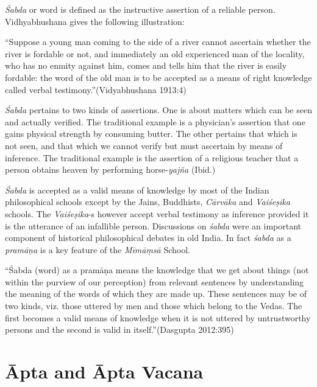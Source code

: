 \textit{Śabda} or word is defined as the instructive assertion of a reliable person. Vidhyabhushana gives the following illustration:

\newpage

\begin{myquote}
“Suppose a young man coming to the side of a river cannot ascertain whether the river is fordable or not, and immediately an old experienced man of the locality, who has no enmity against him, comes and tells him that the river is easily fordable: the word of the old man is to be accepted as a means of right knowledge called verbal testimony.”(Vidyabhushana 1913:4)
\end{myquote}

\textit{Śabda} pertains to two kinds of assertions. One is about matters which can be seen and actually verified. The traditional example is a physician’s assertion that one gains physical strength by consuming butter. The other pertains that which is not seen, and that which we cannot verify but must ascertain by means of inference. The traditional example is the assertion of a religious teacher that a person obtains heaven by performing horse-\textit{yajña} (Ibid.)

\textit{Śabda} is accepted as a valid means of knowledge by most of the Indian philosophical schools except by the Jains, Buddhists, \textit{Cārvāka} and \textit{Vaiśeṣika} schools. The \textit{Vaiśeṣika}-s however accept verbal testimony as inference provided it is the utterance of an infallible person. Discussions on \textit{śabda} were an important component of historical philosophical debates in old India. In fact \textit{śabda} as a \textit{pramāṇa} is a key feature of the \textit{Mīmāṃsā} School.

\begin{myquote}
“Śabda (word) as a pramāṇa means the knowledge that we get about things (not within the purview of our perception) from relevant sentences by understanding the meaning of the words of which they are made up. These sentences may be of two kinds, viz. those uttered by men and those which belong to the Vedas. The first becomes a valid means of knowledge when it is not uttered by untrustworthy persons and the second is valid in itself.”(Dasgupta 2012:395)
\end{myquote}


\section*{Āpta and Āpta Vacana}


